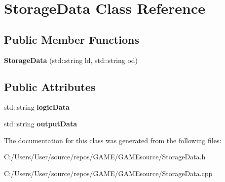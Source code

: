 \hypertarget{class_storage_data}{}\section{Storage\+Data Class Reference}
\label{class_storage_data}
\subsection*{Public Member Functions}
\begin{DoxyCompactItemize}
\item 
\mbox{\label{class_storage_data_aef692cafa14b73abddaac22d527bd6de}} 
{\bfseries Storage\+Data} (std\+::string ld, std\+::string od)
\end{DoxyCompactItemize}
\subsection*{Public Attributes}
\begin{DoxyCompactItemize}
\item 
\mbox{\label{class_storage_data_adf525b90e94d0a64af74653b04ef9995}} 
std\+::string {\bfseries logic\+Data}
\item 
\mbox{\label{class_storage_data_adb52a97f028b7b65977a00df186f9cb8}} 
std\+::string {\bfseries output\+Data}
\end{DoxyCompactItemize}


The documentation for this class was generated from the following files\+:\begin{DoxyCompactItemize}
\item 
C\+:/\+Users/\+User/source/repos/\+G\+A\+M\+E/\+G\+A\+M\+Esource/Storage\+Data.\+h\item 
C\+:/\+Users/\+User/source/repos/\+G\+A\+M\+E/\+G\+A\+M\+Esource/Storage\+Data.\+cpp\end{DoxyCompactItemize}
